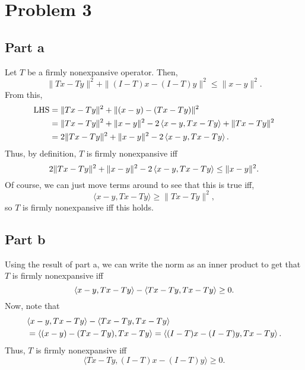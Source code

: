 \documentclass{article}
\begin{document}
\section{Problem 3}
\subsection{Part a}
Let $T$ be a firmly nonexpansive operator. Then, 
\[
\|Tx - Ty\|^2 + \|(I-T) x - (I-T)y\|^2 \leq \|x-y\|^2. 
\]
From this, 
\begin{align*}
\text{LHS}&=\|Tx - Ty\|^2+\|(x-y)-(Tx-Ty)\|^2\\&=
\|Tx - Ty\|^2+\|x-y\|^2-2\left \langle x-y , Tx-Ty \right \rangle+\|Tx-Ty\|^2\\&=
2\|Tx - Ty\|^2+\|x-y\|^2-2\left \langle x-y , Tx-Ty \right \rangle.
\end{align*}
Thus, by definition, $T$ is firmly nonexpansive iff
\[
2\|Tx - Ty\|^2+\|x-y\|^2-2\left \langle x-y , Tx-Ty \right \rangle\leq\|x-y\|^2. 
\]
Of course, we can just move terms around to see that this is true iff, 
\[
\langle x-y, Tx - Ty \rangle \geq \|Tx - Ty\|^2,
\]
so $T$ is firmly nonexpansive iff this holds.

\subsection{Part b}
Using the result of part a, we can write the norm as an inner product to get that $T$ is firmly nonexpansive iff
\[
\langle x-y, Tx - Ty \rangle-\left \langle Tx - Ty , Tx - Ty \right \rangle\geq0.
\]
Now, note that
\begin{align*}
&\langle x-y, Tx - Ty \rangle-\left \langle Tx - Ty , Tx - Ty \right \rangle\\&=
\left \langle (x-y)-(Tx-Ty) , Tx - Ty \right \rangle=\left \langle (I-T)x-(I-T)y , Tx-Ty \right \rangle.
\end{align*}
Thus, $T$ is firmly nonexpansive iff
\[
\langle Tx - Ty, (I-T)x - (I-T)y \rangle \geq 0.
\]
\end{document}
